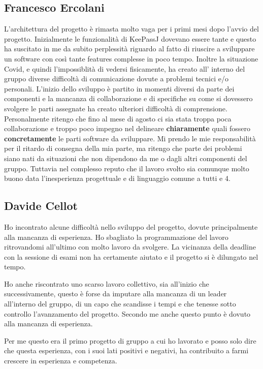 \documentclass[a4paper,12pt]{report}
\begin{document}
\subsection*{Francesco Ercolani}
L'architettura del progetto è rimasta molto vaga per i primi mesi dopo l'avvio del progetto. 
Inizialmente le funzionalità di KeePassJ dovevano essere tante e questo ha suscitato in me 
da subito perplessità riguardo al fatto di riuscire a sviluppare un software con così tante 
features complesse in poco tempo.
Inoltre la situazione Covid, e quindi l'impossiblità di vedersi fisicamente, ha creato all'
interno del gruppo diverse difficoltà di comunicazione dovute a problemi tecnici e/o personali.
L'inizio dello sviluppo è partito in momenti diversi da parte dei componenti e la mancanza di 
collaborazione e di specifiche su come si dovessero svolgere le parti assegnate ha creato ulteriori difficoltà di comprensione.
Personalmente ritengo che fino al mese di agosto ci sia stata troppa poca collaborazione e 
troppo poco impegno nel delineare \textbf{chiaramente} quali fossero \textbf{concretamente} 
le parti software da sviluppare.
Mi prendo le mie responsabilità per il ritardo di consegna della mia parte, ma ritengo che 
parte dei problemi siano nati da situazioni che non dipendono da me o dagli altri componenti del gruppo.
Tuttavia nel complesso reputo che il lavoro svolto sia comunque molto buono data 
l'inesperienza progettuale e di linguaggio comune a tutti e 4.

\subsection*{Davide Cellot}
Ho incontrato alcune difficoltà nello sviluppo del progetto, dovute principalmente alla mancanza di esperienza. Ho sbagliato la programmazione del lavoro ritrovandomi all’ultimo con molto lavoro da svolgere. La vicinanza della deadline con la sessione di esami non ha certamente aiutato e il progetto si è dilungato nel tempo.

Ho anche riscontrato uno scarso lavoro collettivo, sia all’inizio che successivamente, questo è forse da imputare alla mancanza di un leader all’interno del gruppo, di un capo che scandisse i tempi e che tenesse sotto controllo l’avanzamento del progetto. Secondo me anche questo punto è dovuto alla mancanza di esperienza.

Per me questo era il primo progetto di gruppo a cui ho lavorato e posso solo dire che questa esperienza, con i suoi lati positivi e negativi, ha contribuito a farmi crescere in esperienza e competenza.
\end{document}
